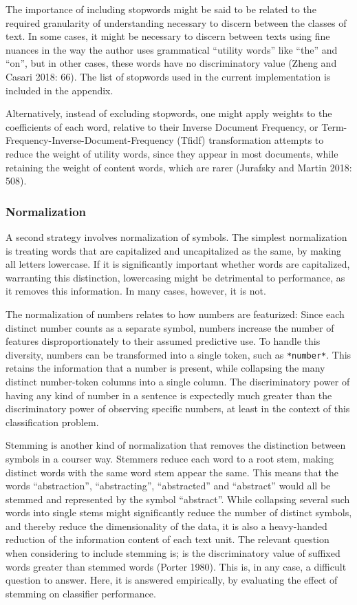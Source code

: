 \documentclass[12pt,twoside]{reedthesis}
\begin{document}
The importance of including stopwords might be said to be related to the
required granularity of understanding necessary to discern between the
classes of text. In some cases, it might be necessary to discern between
texts using fine nuances in the way the author uses grammatical
``utility words'' like ``the'' and ``on'', but in other cases, these
words have no discriminatory value (Zheng and Casari 2018: 66). The list
of stopwords used in the current implementation is included in the
appendix.

Alternatively, instead of excluding stopwords, one might apply weights
to the coefficients of each word, relative to their Inverse Document
Frequency, or Term-Frequency-Inverse-Document-Frequency (Tfidf)
transformation attempts to reduce the weight of utility words, since
they appear in most documents, while retaining the weight of content
words, which are rarer (Jurafsky and Martin 2018: 508).

\subsubsection{Normalization}\label{normalization}

A second strategy involves normalization of symbols. The simplest
normalization is treating words that are capitalized and uncapitalized
as the same, by making all letters lowercase. If it is significantly
important whether words are capitalized, warranting this distinction,
lowercasing might be detrimental to performance, as it removes this
information. In many cases, however, it is not.

The normalization of numbers relates to how numbers are featurized:
Since each distinct number counts as a separate symbol, numbers increase
the number of features disproportionately to their assumed predictive
use. To handle this diversity, numbers can be transformed into a single
token, such as \texttt{*number*}. This retains the information that a
number is present, while collapsing the many distinct number-token
columns into a single column. The discriminatory power of having any
kind of number in a sentence is expectedly much greater than the
discriminatory power of observing specific numbers, at least in the
context of this classification problem.

Stemming is another kind of normalization that removes the distinction
between symbols in a courser way. Stemmers reduce each word to a root
stem, making distinct words with the same word stem appear the same.
This means that the words ``abstraction'', ``abstracting'',
``abstracted'' and ``abstract'' would all be stemmed and represented by
the symbol ``abstract''. While collapsing several such words into single
stems might significantly reduce the number of distinct symbols, and
thereby reduce the dimensionality of the data, it is also a heavy-handed
reduction of the information content of each text unit. The relevant
question when considering to include stemming is; is the discriminatory
value of suffixed words greater than stemmed words (Porter 1980). This
is, in any case, a difficult question to answer. Here, it is answered
empirically, by evaluating the effect of stemming on classifier
performance.
\end{document}
